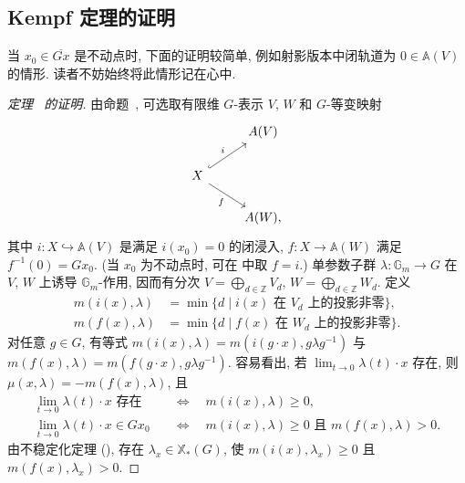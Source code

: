 \subsection{Kempf 定理的证明}\label{src:8.6.3-subsection}
当 $x_0\in\overline{Gx}$ 是不动点时, 下面的证明较简单, 例如射影版本中闭轨道为 $0\in\mathbb A(V)$ 的情形. 读者不妨始终将此情形记在心中.
\begin{proof}[定理~ 的证明]
由命题~, 可选取有限维 $G$-表示 $V$, $W$ 和 $G$-等变映射
\begin{equation}\label{src:8.6.8}
\begin{tikzcd}[ampersand replacement=\&]
{}\&\mathbb A(V)\\
X\arrow[ur,hook,"i"]\arrow[dr,"f"']\&{}\\
{}\&\mathbb A(W),
\end{tikzcd}
\end{equation}
其中 $i:X\hookrightarrow\mathbb A(V)$ 是满足 $i(x_0)=0$ 的闭浸入, $f:X\to\mathbb A(W)$ 满足 $f^{-1}(0)=Gx_0$. (当 $x_0$ 为不动点时, 可在  中取 $f=i$.) 单参数子群 $\lambda:\mathbb G_m\to G$ 在 $V$, $W$ 上诱导 $\mathbb G_m$-作用, 因而有分次 $V=\bigoplus_{d\in\mathbb Z}V_d$, $W=\bigoplus_{d\in\mathbb Z}W_d$. 定义
\begin{align*}
m(i(x),\lambda)&=\min\{d\mid i(x)\text{ 在 }V_d\text{ 上的投影非零}\},\\
m(f(x),\lambda)&=\min\{d\mid f(x)\text{ 在 }W_d\text{ 上的投影非零}\}.
\end{align*}
对任意 $g\in G$, 有等式 $m(i(x),\lambda)=m(i(g\cdot x),g\lambda g^{-1})$ 与 $m(f(x),\lambda)=m(f(g\cdot x),g\lambda g^{-1})$. 容易看出, 若 $\lim_{t\to0}\lambda(t)\cdot x$ 存在, 则 $\mu(x,\lambda)=-m(f(x),\lambda)$, 且
\begin{align*}
\lim_{t\to0}\lambda(t)\cdot x\text{ 存在}&\quad\Longleftrightarrow\quad m(i(x),\lambda)\geq0,\\
\lim_{t\to0}\lambda(t)\cdot x\in Gx_0&\quad\Longleftrightarrow\quad m(i(x),\lambda)\geq0\text{ 且 }m(f(x),\lambda)>0.
\end{align*}
由不稳定化定理 (), 存在 $\lambda_x\in\mathbb X_*(G)$, 使 $m(i(x),\lambda_x)\geq0$ 且 $m(f(x),\lambda_x)>0$.


\end{proof}
